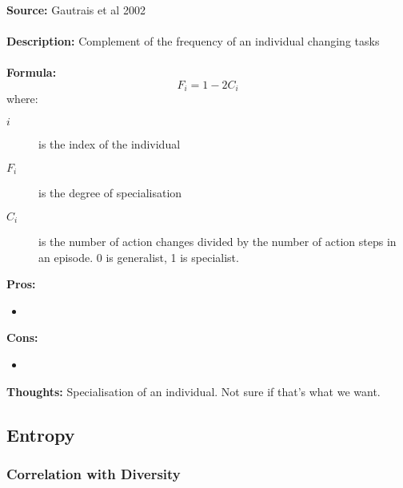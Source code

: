 \documentclass[12pt]{article}
\begin{document}
\textbf{Source: } Gautrais et al 2002 \cite{gautrais:JTB:2002} \\\\
\textbf{Description: } Complement of the frequency of an individual changing tasks\\\\
\textbf{Formula: }\\
%
\[
F_{i} = 1 - 2 C_{i}
\]
%
where:
\begin{description}
\item[$i$] is the index of the individual
\item[$F_{i}$] is the degree of specialisation
\item[$C_{i}$] is the number of action changes divided by the number of action steps in an episode. 0 is generalist, 1 is specialist.
\end{description}
\textbf{Pros:}
\begin{itemize}
\item 
\end{itemize}
\textbf{Cons:}
\begin{itemize}
\item 
\end{itemize}
\textbf{Thoughts:} Specialisation of an individual. Not sure if that's what we want.\\

\subsection{Entropy}

\subsubsection{Correlation with Diversity}
\end{document}
